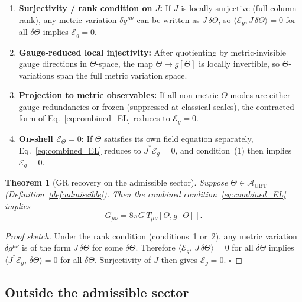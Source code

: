 \documentclass[12pt]{article}
\newtheorem{theorem}{Theorem}[section]
\theoremstyle{definition}
\theoremstyle{remark}
\begin{document}
\begin{enumerate}
  \item \textbf{Surjectivity / rank condition on $J$:} If $J$ is locally
    surjective (full column rank), any metric variation $\delta g^{\mu\nu}$
    can be written as $J\,\delta\Theta$, so
    $\langle\mathcal{E}_g, J\,\delta\Theta\rangle = 0$ for all $\delta\Theta$
    implies $\mathcal{E}_g = 0$.

  \item \textbf{Gauge-reduced local injectivity:} After quotienting by metric-invisible
    gauge directions in $\Theta$-space, the map $\Theta\mapsto g[\Theta]$ is
    locally invertible, so $\Theta$-variations span the full metric variation
    space.

  \item \textbf{Projection to metric observables:} If all non-metric $\Theta$
    modes are either gauge redundancies or frozen (suppressed at classical
    scales), the contracted form of Eq.~\eqref{eq:combined_EL} reduces to
    $\mathcal{E}_g = 0$.

  \item \textbf{On-shell $\mathcal{E}_\Theta = 0$:} If $\Theta$ satisfies its
    own field equation separately, Eq.~\eqref{eq:combined_EL} reduces to
    $J^{*}\mathcal{E}_g = 0$, and condition~(1) then implies $\mathcal{E}_g = 0$.
\end{enumerate}

\begin{theorem}[GR recovery on the admissible sector]
\label{thm:gr_recovery}
Suppose $\Theta \in \mathcal{A}_{\mathrm{UBT}}$ (Definition~\ref{def:admissible}).
Then the combined condition~\eqref{eq:combined_EL} implies
\begin{equation}
  G_{\mu\nu} = 8\pi G\, T_{\mu\nu}[\Theta, g[\Theta]].
  \label{eq:einstein}
\end{equation}
\end{theorem}

\begin{proof}[Proof sketch]
Under the rank condition (conditions~1 or~2), any metric variation
$\delta g^{\mu\nu}$ is of the form $J\,\delta\Theta$ for some $\delta\Theta$.
Therefore $\langle\mathcal{E}_g,\,J\,\delta\Theta\rangle = 0$ for all
$\delta\Theta$ implies $\langle J^*\mathcal{E}_g,\,\delta\Theta\rangle = 0$
for all $\delta\Theta$.  Surjectivity of $J$ then gives $\mathcal{E}_g = 0$.
\hfill$\square$
\end{proof}

\subsection{Outside the admissible sector}
\end{document}
